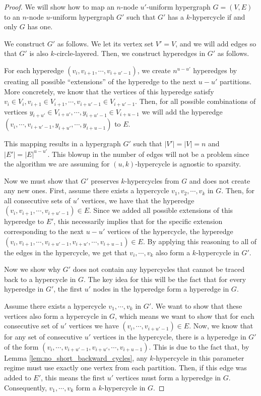 \documentclass[11pt,letterpaper,pdftex]{article}
\begin{document}
\begin{proof}
    We will show how to map an $n$-node $u'$-uniform hypergraph $G=(V,E)$ to an $n$-node $u$-uniform hypergraph $G'$ such that $G'$ has a $k$-hypercycle if and only $G$ has one.

    We construct $G'$ as follows.
    We let its vertex set $V'=V$, and we will add edges so that $G'$ is also $k$-circle-layered.
    Then, we construct hyperedges in $G'$ as follows.

    For each hyperedge $(v_i,v_{i+1}, \cdots , v_{i+u'-1})$, we create $n^{u-u'}$ hyperedges by creating all possible ``extensions'' of the hyperedge to the next $u-u'$ partitions.
    More concretely, we know that the vertices of this hyperedge satisfy $v_i \in V_i, v_{i+1} \in V_{i+1}, \cdots, v_{i+u'-1} \in V_{i+u'-1}$.
    Then, for all possible combinations of vertices $y_{i+u'} \in V_{i+u'}, \cdots, y_{i+u'-1} \in V_{i+u-1}$ we will add the hyperedge $(v_i,\cdots,v_{i+u'-1},y_{i+u'},\cdots, y_{i+u-1})$ to $E$.

    This mapping results in a hypergraph $G'$ such that $|V'|=|V|=n$ and $|E'|=|E|^{u-u'}$.
    This blowup in the number of edges will not be a problem since the algorithm we are assuming for $(u,k)$-hypercycle is agnostic to sparsity.

    Now we must show that $G'$ preserves $k$-hypercycles from $G$ and does not create any new ones.
    First, assume there exists a hypercycle $v_1, v_2, \cdots, v_k$ in $G$.
    Then, for all consecutive sets of $u'$ vertices, we have that the hyperedge $(v_{i},v_{i+1},\cdots, v_{i+u'-1}) \in E$.
    Since we added all possible extensions of this hyperedge to $E'$, this necessarily implies that for the specific extension corresponding to the next $u-u'$ vertices of the hypercycle, the hyperedge $(v_i,v_{i+1},\cdots,v_{i+u'-1},v_{i+u'}, \cdots, v_{i+u-1}) \in E$.
    By applying this reasoning to all of the edges in the hypercycle, we get that $v_i, \cdots, v_k$ also form a $k$-hypercycle in $G'$.

    Now we show why $G'$ does not contain any hypercycles that cannot be traced back to a hypercycle in $G$.
    The key idea for this will be the fact that for every hyperedge in $G'$, the first $u'$ nodes in the hyperedge form a hyperedge in $G$.
    
    Assume there exists a hypercycle $v_1, \cdots, v_k$ in $G'$.
    We want to show that these vertices also form a hypercycle in $G$, which means we want to show that for each consecutive set of $u'$ vertices we have $(v_i,\cdots, v_{i+u'-1}) \in E$.
    Now, we know that for any set of consecutive $u'$ vertices in the hypercycle, there is a hyperedge in $G'$ of the form $(v_i,\cdots, v_{i+u'-1},v_{i+u'},\cdots, v_{i+u-1})$.
    This is due to the fact that, by Lemma \ref{lem:no_short_backward_cycles}, any $k$-hypercycle in this parameter regime must use exactly one vertex from each partition.
    Then, if this edge was added to $E'$, this means the first $u'$ vertices must form a hyperedge in $G$.
    Consequently, $v_1, \cdots, v_k$ form a $k$-hypercycle in $G$.


\end{proof}
\end{document}
